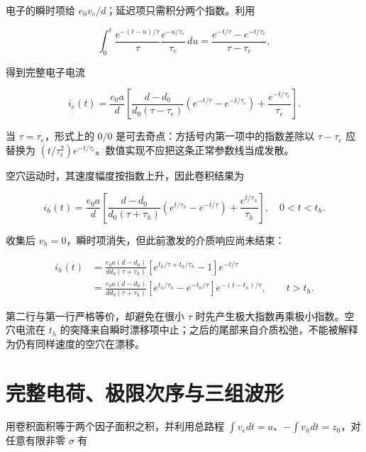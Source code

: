 \documentclass[
  11pt,
  a4paper,
  oneside,
  openany]{report}
\numberwithin{equation}{chapter}
\begin{document}
电子的瞬时项给 \(e_0v_e/d\)；延迟项只需积分两个指数。利用

\nopagebreak[3]
\begin{equation}
\int_0^t \frac{e^{-(t-u)/\tau}}{\tau}\frac{e^{-u/\tau_e}}{\tau_e}\,du
=\frac{e^{-t/\tau}-e^{-t/\tau_e}}{\tau-\tau_e},
\end{equation}

得到完整电子电流

\nopagebreak[3]
\begin{equation}
i_e(t)=\frac{e_0a}{d}\left[
\frac{d-d_0}{d_0(\tau-\tau_e)}\left(e^{-t/\tau}-e^{-t/\tau_e}\right)
+\frac{e^{-t/\tau_e}}{\tau_e}\right].
\end{equation}

当 \(\tau=\tau_e\)，形式上的 \(0/0\)
是可去奇点：方括号内第一项中的指数差除以 \(\tau-\tau_e\) 应替换为
\((t/\tau_e^2)e^{-t/\tau_e}\)。数值实现不应把这条正常参数线当成发散。

空穴运动时，其速度幅度按指数上升，因此卷积结果为

\nopagebreak[3]
\begin{equation}
i_h(t)=\frac{e_0a}{d}\left[
\frac{d-d_0}{d_0(\tau+\tau_h)}\left(e^{t/\tau_h}-e^{-t/\tau}\right)
+\frac{e^{t/\tau_h}}{\tau_h}\right],\quad 0<t<t_h.
\end{equation}

收集后 \(v_h=0\)，瞬时项消失，但此前激发的介质响应尚未结束：

\nopagebreak[3]
\begin{equation}
\begin{aligned}
i_h(t)&=\frac{e_0a(d-d_0)}{dd_0(\tau+\tau_h)}
\left[e^{t_h/\tau+t_h/\tau_h}-1\right]e^{-t/\tau}\\
&=\frac{e_0a(d-d_0)}{dd_0(\tau+\tau_h)}
\left[e^{t_h/\tau_h}-e^{-t_h/\tau}\right]e^{-(t-t_h)/\tau},\qquad t>t_h.
\end{aligned}
\end{equation}

第二行与第一行严格等价，却避免在很小 \(\tau\)
时先产生极大指数再乘极小指数。空穴电流在 \(t_h\)
的突降来自瞬时漂移项中止；之后的尾部来自介质松弛，不能被解释为仍有同样速度的空穴在漂移。

\section{完整电荷、极限次序与三组波形}\label{sec-silicon-integrals}

用卷积面积等于两个因子面积之积，并利用总路程
\(\int v_e dt=a\)、\(-\int v_hdt=z_0\)，对任意有限非零 \(\sigma\) 有
\end{document}
